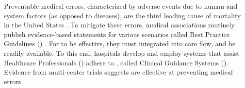 
\noindent Preventable medical errors, characterized by adverse events due to human and
system factors (as opposed to diseases), are the third leading cause of mortality
in the United States \cite{MakaryBMJ16}. To mitigate these errors,
medical associations routinely publish evidence-based statements for various scenarios called
Best Practice Guidelines (\BPGs{}) \cite{field1990clinical}. For \BPGs{} to be
effective, they must integrated into care flow, and be readily available.
To this end, hospitals develop and employ systems that assist Healthcare Professionals
(\HCPs{}) adhere to \BPGs{}, called Clinical Guidance Systems (\CGSs{}).
Evidence from multi-center trials suggests \CGSs{} are effective at preventing medical
errors \cite{BenettJAMIA16,SahotaJIS11}.

